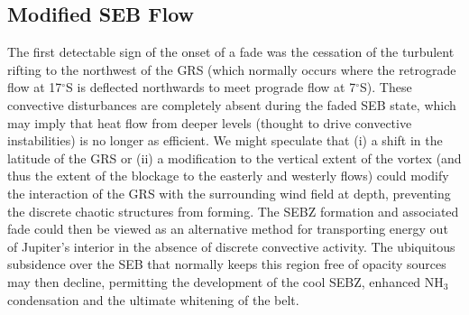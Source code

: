 \documentclass[final,5p,times,twocolumn,authoryear]{elsarticle}
\begin{document}



\subsection{Modified SEB Flow}

The first detectable sign of the onset of a fade was the cessation of the turbulent rifting to the northwest of the GRS (which normally occurs where the retrograde flow at 17$^\circ$S is deflected northwards to meet prograde flow at 7$^\circ$S).  These convective disturbances are completely absent during the faded SEB state, which may imply that heat flow from deeper levels (thought to drive convective instabilities) is no longer as efficient.  We might speculate that (i) a shift in the latitude of the GRS or (ii) a modification to the vertical extent of the vortex (and thus the extent of the blockage to the easterly and westerly flows) could modify the interaction of the GRS with the surrounding wind field at depth, preventing the discrete chaotic structures from forming.  The SEBZ formation and associated fade could then be viewed as an alternative method for transporting energy out of Jupiter's interior in the absence of discrete convective activity.  The ubiquitous subsidence over the SEB that normally keeps this region free of opacity sources \citep[see, e.g.,][]{10fletcher_grs} may then decline, permitting the development of the cool SEBZ, enhanced NH$_3$ condensation and the ultimate whitening of the belt.
\end{document}
